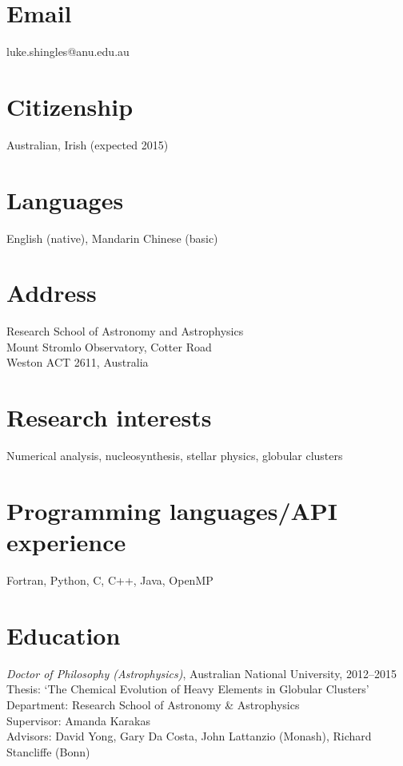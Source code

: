 \documentclass[11pt]{res} %
\begin{document}
 
 

\begin{resume}

\section{Email} 
	luke.shingles@anu.edu.au


\section{Citizenship} 
	Australian, Irish (expected 2015)

\section{Languages} 
	English (native), Mandarin Chinese (basic)

\section{Address} 
	Research School of Astronomy and Astrophysics\\
	Mount Stromlo Observatory, Cotter Road \\ 
	Weston ACT 2611, Australia
 	
\section{Research interests}
	 Numerical analysis, nucleosynthesis, stellar physics, globular clusters

\section{Programming languages/API experience}
	Fortran, Python, C, C++, Java, OpenMP

\section{Education} 
	{\it Doctor of Philosophy (Astrophysics)}, Australian National University, 2012--2015\\
	Thesis: `The Chemical Evolution of Heavy Elements in Globular Clusters'\\
	Department: Research School of Astronomy \& Astrophysics\\
	Supervisor: Amanda Karakas\\
	Advisors: David Yong, Gary Da Costa, John Lattanzio (Monash), Richard Stancliffe (Bonn)


\end{resume}
\end{document}
